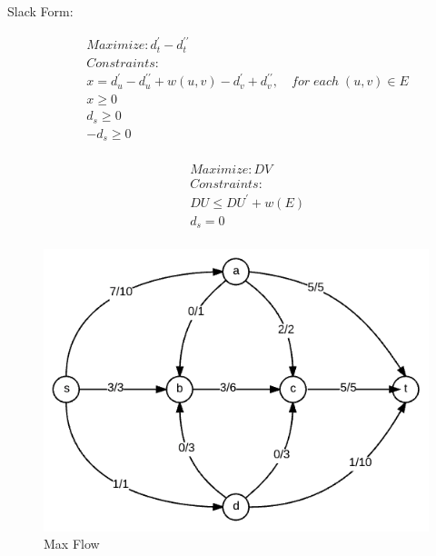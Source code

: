 \documentclass[11pt]{article}
\begin{document}
Slack Form:

\begin{align*}
\quad & Maximize: d_t^\prime - d_t^{\prime\prime}\\
      & Constraints:\\
      & x = d_u^\prime - d_u^{\prime\prime} + w(u,v) - d_v^\prime + d_v^{\prime\prime}, \quad for\;each\;(u,v) \in E\\
      & x \geq 0\\
      & d_s \geq 0\\
      & -d_s \geq 0\\
\end{align*}

\bigskip


\begin{align*}
\quad & Maximize: DV\\
      & Constraints:\\
      & DU \leq DU^\prime + w(E)\\
      & d_s = 0\\
\end{align*}


\newpage

\begin{figure}[h!]
\begin{center}
\includegraphics[scale=0.4]{MaxFlowGraph.png}
\caption{Max Flow}
\label{fig:maxFlow}
\end{center}
\end{figure}
\end{document}
